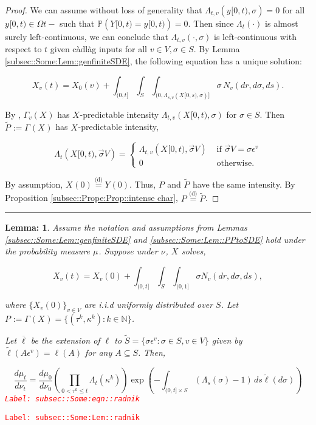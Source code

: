 \documentclass[12pt]{article}
\newcommand{\mb}{\mathbb}
\newcommand{\ov}{\overline}
\newcommand{\te}{\text}
\newcommand{\ep}{\epsilon}
\newcommand{\tr}{\textcolor{red}}
\newcommand{\labe}[1]{\tr{\texttt{Label: #1}}}
\newcommand{\ind}{\hspace{24pt}}
\newcommand{\lin}{\rule{\linewidth}{0.4 pt}}
\newcommand{\pr}{\mb{P}}							%
\newcommand{\deq}{\overset{\text{(d)}}{=}}			%
\newcommand{\defeq}{:=}								%
\renewcommand{\v}{v}							%
\renewcommand{\S}{S}							%
\newcommand{\s}{\sigma}							%
\newcommand{\sv}{\vec{\s}}						%
\newcommand{\ev}[1]{\ep^{#1}}					%
\renewcommand{\t}{t}							%
\renewcommand{\tt}{s}							%
\newcommand{\poiss}[1]{N_{#1}}						%
\newcommand{\V}{V}									%
\renewcommand{\r}{r}								%
\newcommand{\rt}[1]{\tau^{#1}}						%
\renewcommand{\it}{k}								%
\newcommand{\XState}[1]{\S^{#1}}				%
\newcommand{\rxvt}[2]{X_{#1}{(#2)}}					%
\newcommand{\rxvtt}[2]{Y_{#1}{(#2)}}				%
\newcommand{\xvtts}[2]{y_{#1}{#2}}					%
\newcommand{\rxvts}[2]{X_{#1}{#2}}					%
\newcommand{\rxvtts}[2]{Y_{#1}{#2}}					%
\newcommand{\rp}[1]{P^{#1}}							%
\newcommand{\m}[3]{\mu_{#2#1}^{#3}}						%
\newcommand{\mm}[3]{\nu_{#2#1}^{#3}}						%
\newcommand{\ratee}[1]{\Lambda_{#1}}				%
\newcommand{\Sm}{\ell}								%
\newcommand{\alt}{\widetilde}						%
\newcommand{\typset}{A}							%
\renewcommand{\mark}[1]{\kappa^{#1}}				%
\newcommand{\pmap}[1]{\Gamma_{#1}}				%
\newtheorem{lem}[thms]{Lemma: }
\begin{document}
\begin{proof}

We can assume without loss of generality that \(\ratee{\t,\v}(\xvtts{}{[0,\t)},\s) = 0\) for all \(\xvtts{}{[0,\t)}\in \Omega{}{\t-}\) such that \(\pr(\rxvtts{}{[0,\t)} = \xvtts{}{[0,\t)}) = 0\). Then since \(\ratee{\t}(\cdot)\) is almost surely left-continuous, we can conclude that \(\ratee{\t,\v}(\cdot,\s)\) is left-continuous with respect to \(\t\) given c\`adl\`ag inputs for all \(\v\in \V,\s\in\S\). By Lemma \ref{subsec::Some:Lem::genfiniteSDE}, the following equation has a unique solution:

\[\rxvt{\v}{\t} = \rxvt{0}{\v} + \int_{(0,\t]}\int_\S\int_{(0,\ratee{\tt,\v}(\rxvts{}{[0,\tt)},\s)]}  \s\,\poiss{\v}(d\r,d\s,d\tt).\]

By \cite[Exercise 14.7.1]{DalVer08}, \(\pmap{\v}(\rxvts{}{})\) has \(\rxvts{}{}\)-predictable intensity \(\ratee{\t,\v}(\rxvts{}{[0,\t)},\s)\) for \(\s \in \S\). Then \(\alt{\rp{}} \defeq \pmap{}(\rxvts{}{})\) has \(\rxvts{}{}\)-predictable intensity,

\[\ratee{\t}(\rxvts{}{[0,\t)},\sv{}{\V}) = \begin{cases}
\ratee{\t,\v}(\rxvts{}{[0,\t)},\sv{}{\V}) &\te{ if } \sv{}{\V} = \s\ev{\v}\\
0&\te{ otherwise.}
\end{cases}\]

By assumption, \(\rxvt{}{0} \deq \rxvtt{}{0}\). Thus, \(\rp{}\) and \(\alt{\rp{}}\) have the same intensity. By Proposition \ref{subsec::Prope:Prop::intense char}, \(\rp{} \deq \alt{\rp{}}\).
\end{proof}
\lin

\begin{lem}
Assume the notation and assumptions from Lemmas \ref{subsec::Some:Lem::genfiniteSDE} and \ref{subsec::Some:Lem::PPtoSDE} hold under the probability measure \(\m{}{}{}\). Suppose under \(\mm{}{}{}\), \(\rxvts{}{}\) solves,

\[\rxvt{\v}{\t} = \rxvt{\v}{0} +\int_{(0,\t]}\int_\S\int_{(0,1]} \s \poiss{\v}(d\r,d\s,d\tt),\]

where \(\{\rxvt{\v}{0}\}_{\v \in \V}\) are i.i.d uniformly distributed over \(\S\). Let \(\rp{} \defeq \pmap{}(\rxvts{}{}) = \{(\rt{\it},\mark{\it}):\it\in \mb{N}\}\).

\ind Let \(\ov{\ell}\) be the extension of \(\Sm\) to \(\alt{\S} = \{\s\ev{\v}: \s \in \S, \v \in \V\}\) given by \(\alt{\Sm}(\typset\ev{\v}) = \Sm(\typset)\) for any \(\typset \subseteq \S\). Then,

\begin{equation}
\frac{d\m{}{\t}{}}{d\mm{}{\t}{}}= \frac{d\m{}{0}{}}{d\mm{}{0}{}}\left(\prod_{0< \rt{\it}\leq t} \ratee{\t}(\mark{\it})\right)\exp\left(-\int_{(0,\t]\times \S} (\ratee{\tt}(\s) - 1)\,d\tt\alt{\Sm}(d\s)\right)
\label{subsec::Some:eqn::radnik}
\end{equation}
\labe{subsec::Some:eqn::radnik}
\label{subsec::Some:Lem::radnik}
\end{lem}
\labe{subsec::Some:Lem::radnik}
\end{document}
